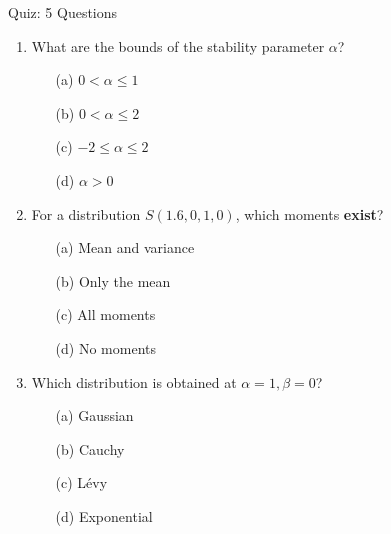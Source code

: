 \documentclass[9pt, aspectratio=169, t]{beamer}
\begin{document}
\begin{frame}{Quiz: 5 Questions}
    \begin{cminipage}{0.95\textwidth}
\begin{enumerate}\setlength{\itemsep}{0pt}
    \item What are the bounds of the stability parameter $\alpha$?
    \begin{enumerate}\setlength{\itemsep}{0pt}
        \item[(a)] $0 < \alpha \leq 1$
        \item[(b)] $0 < \alpha \leq 2$
        \item[(c)] $-2 \leq \alpha \leq 2$
        \item[(d)] $\alpha > 0$
    \end{enumerate}

    \vspace{0.2cm}
    \item For a distribution $S(1.6, 0, 1, 0)$, which moments \textbf{exist}?
    \begin{enumerate}\setlength{\itemsep}{0pt}
        \item[(a)] Mean and variance
        \item[(b)] Only the mean
        \item[(c)] All moments
        \item[(d)] No moments
    \end{enumerate}

    \vspace{0.2cm}
    \item Which distribution is obtained at $\alpha = 1, \beta = 0$?
    \begin{enumerate}\setlength{\itemsep}{0pt}
        \item[(a)] Gaussian
        \item[(b)] Cauchy
        \item[(c)] L\'{e}vy
        \item[(d)] Exponential
    \end{enumerate}
\end{enumerate}
    \end{cminipage}
\end{frame}
\end{document}
